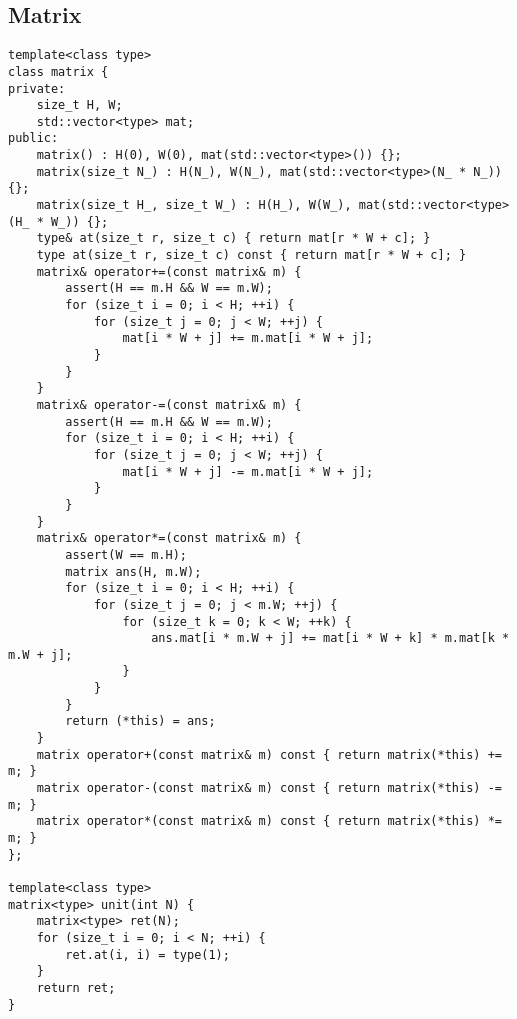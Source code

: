 \documentclass[10pt]{article}
\begin{document}
\subsection{Matrix}
\begin{lstlisting}
template<class type>
class matrix {
private:
	size_t H, W;
	std::vector<type> mat;
public:
	matrix() : H(0), W(0), mat(std::vector<type>()) {};
	matrix(size_t N_) : H(N_), W(N_), mat(std::vector<type>(N_ * N_)) {};
	matrix(size_t H_, size_t W_) : H(H_), W(W_), mat(std::vector<type>(H_ * W_)) {};
	type& at(size_t r, size_t c) { return mat[r * W + c]; }
	type at(size_t r, size_t c) const { return mat[r * W + c]; }
	matrix& operator+=(const matrix& m) {
		assert(H == m.H && W == m.W);
		for (size_t i = 0; i < H; ++i) {
			for (size_t j = 0; j < W; ++j) {
				mat[i * W + j] += m.mat[i * W + j];
			}
		}
	}
	matrix& operator-=(const matrix& m) {
		assert(H == m.H && W == m.W);
		for (size_t i = 0; i < H; ++i) {
			for (size_t j = 0; j < W; ++j) {
				mat[i * W + j] -= m.mat[i * W + j];
			}
		}
	}
	matrix& operator*=(const matrix& m) {
		assert(W == m.H);
		matrix ans(H, m.W);
		for (size_t i = 0; i < H; ++i) {
			for (size_t j = 0; j < m.W; ++j) {
				for (size_t k = 0; k < W; ++k) {
					ans.mat[i * m.W + j] += mat[i * W + k] * m.mat[k * m.W + j];
				}
			}
		}
		return (*this) = ans;
	}
	matrix operator+(const matrix& m) const { return matrix(*this) += m; }
	matrix operator-(const matrix& m) const { return matrix(*this) -= m; }
	matrix operator*(const matrix& m) const { return matrix(*this) *= m; }
};

template<class type>
matrix<type> unit(int N) {
	matrix<type> ret(N);
	for (size_t i = 0; i < N; ++i) {
		ret.at(i, i) = type(1);
	}
	return ret;
}
\end{lstlisting}
\end{document}
